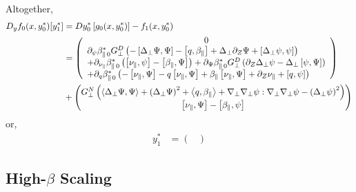 \documentclass{article}
\newcommand{\para}{\parallel}
\newcommand{\np}{\nabla_\perp}
\newcommand{\lap}{\Delta_\perp}
\newcommand{\p}{\partial}
\newcommand{\GN}{G_\perp^N}
\newcommand{\GD}{G_\perp^D}
\newcommand{\pth} [1] {\left( #1 \right) }
\newcommand{\br} [1] {\left[ #1 \right] }
\newcommand{\pmat} [1] {\begin{pmatrix} #1 \end{pmatrix}}
\begin{document}
Altogether,
\begin{align*}
D_yf_0(x,y_0^*)[y_1^*] &= Dy_0^*\br{g_0(x,y_0^*)} - f_1(x, y_0^*) \\
&= \left( \begin{array}{l}
    \multicolumn{1}{c}{0} \\
    \p_\psi\beta_{\para\,0}^*\GD \pth{- \br{\lap\Psi, \Psi} - \br{q, \beta_\para} + \lap\p_Z\Psi + \br{\lap\psi, \psi}} \\
    + \p_{\nu_\para}\beta_{\para\,0}^* \pth{\br{\nu_\para, \psi} - \br{\beta_\para, \Psi}}
    + \p_\Psi\beta_{\para\,0}^*\GD \pth{\p_Z\lap\psi - \lap\br{\psi, \Psi}} \\
    + \p_q\beta_{\para\,0}^* \pth{- \br{\nu_\para, \Psi} -  q\br{\nu_\para, \Psi} + \beta_\para\br{\nu_\para, \Psi} + \p_Z\nu_\para + \br{q, \psi}}
\end{array} \right) \\
&+ \pmat{\GN\pth{\Braket{\lap\Psi, \Psi} + \pth{\lap\Psi}^2 + \Braket{q,\beta_\para} + \np\np\psi:\np\np\psi - \pth{\lap\psi}^2} \\
\br{\nu_\para, \Psi} - \br{\beta_\para, \psi}}
\end{align*}
or,
\begin{align}
    y_1^* &= \pmat{ \\ }
\end{align}






\subsection{High-$\beta$ Scaling}
\end{document}
